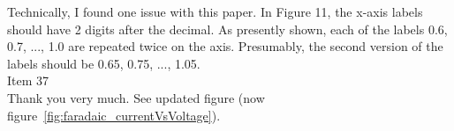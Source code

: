 \documentclass[journal, a4paper]{IEEEtran}
\begin{document}
{Technically, I found one issue with this paper. In Figure 11, the x-axis labels should have 2 digits after the decimal. As presently shown, each of the labels 0.6, 0.7, ..., 1.0 are repeated twice on the axis. Presumably, the second version of the labels should be 0.65, 0.75, ..., 1.05.\\
{\color{OliveGreen}
    Item 37\\
    Thank you very much. See updated figure (now figure~\ref{fig:faradaic_currentVsVoltage}).
}\\
}
\end{document}
